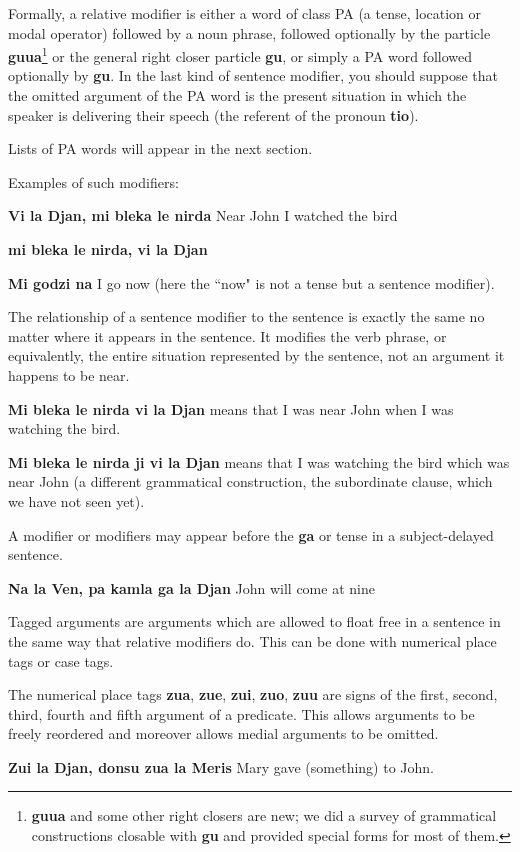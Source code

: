 \documentclass[12pt]{book}
\begin{document}
{Formally, a relative modifier is either a word of class PA (a tense, location or modal operator) followed by a noun phrase, followed optionally by the particle {\bf guua}\footnote{{\bf guua} and some other right closers are new;  we did a survey of grammatical constructions closable with {\bf gu} and provided special forms for most of them.} or the general right closer particle {\bf gu}, or simply a PA word followed optionally by {\bf gu}.  In the last kind of sentence modifier, you should suppose that the omitted argument
of the PA word is the present situation in which the speaker is delivering their speech (the referent of the pronoun {\bf tio}).

Lists of PA words will appear in the next section.

Examples of such modifiers:

{\bf Vi la Djan, mi bleka le nirda}  Near John I watched the bird

{\bf mi bleka le nirda, vi la Djan}

{\bf Mi godzi na}  I go now (here the ``now" is not a tense but a sentence modifier).

The relationship of a sentence modifier to the sentence is exactly the same no matter where it appears in the sentence.  It modifies the verb phrase, or equivalently, the entire situation represented by the sentence, not an argument it happens to be near.

{\bf Mi bleka le nirda vi la Djan}  means that I was near John when I was watching the bird.  

{\bf Mi bleka le nirda ji vi la Djan}  means that I was watching the bird which was near John (a different grammatical construction, the subordinate clause, which we have not seen yet).

A modifier or modifiers may appear before the {\bf ga} or tense in a subject-delayed sentence.

{\bf Na la Ven, pa kamla ga la Djan}  John will come at nine

Tagged arguments are arguments which are allowed to float free in a sentence in the same way that relative modifiers do.  This can be done with numerical place tags or case tags.

The numerical place tags {\bf zua}, {\bf zue}, {\bf zui}, {\bf zuo}, {\bf zuu} are signs of the first, second, third, fourth and fifth argument of a predicate.  This allows
arguments to be freely reordered and moreover allows medial arguments to be omitted.

{\bf Zui la Djan, donsu zua la Meris}  Mary gave (something) to John.

}
\end{document}
